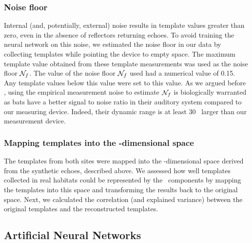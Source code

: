 \documentclass[preprint,5p]{elsarticle}
\begin{document}
\subsubsection{Noise floor}

Internal (and, potentially, external) noise results in template values greater than zero, even in the absence of reflectors returning echoes. To avoid training the neural network on this noise, we estimated the noise floor in our data by collecting templates while pointing the device to empty space. The maximum template value obtained from these template measurements was used as the noise floor $\mathcal{N}_f$. The value of the noise floor $\mathcal{N}_f$ used had a numerical value of 0.15. Any template values below this value were set to this value. As we argued before \citep{Vanderelst2016}, using the empirical measurement noise to estimate $\mathcal{N}_f$ is biologically warranted as bats have a better signal to noise ratio in their auditory system compared to our measuring device. Indeed, their dynamic range is at least 30 \db\ larger than our measurement device.

\subsubsection{Mapping templates into the \pca-dimensional space}

The templates from both sites were mapped into the \pca-dimensional space derived from the synthetic echoes, described above. We assessed how well templates collected in real habitats could be represented by the \pca\ components by mapping the templates into this space and transforming the results back to the original space. Next, we calculated the correlation (and explained variance) between the original templates and the reconstructed templates.

\subsection{Artificial Neural Networks}
\end{document}
